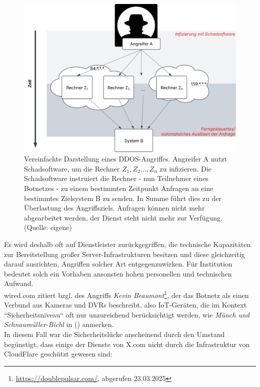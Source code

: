 \begin{figure}
    \centering
    \includegraphics[scale=0.3]{aufgabe 2/img/ddos.svg}
    \caption{Vereinfachte Darstellung eines DDOS-Angriffes. Angreifer A nutzt Schadsoftware, um die Rechner $Z_1, Z_2 \ldots, Z_n$ zu infizieren. Die Schadsoftware  instruiert die Rechner - nun Teilnehmer eines Botnetzes - zu einem bestimmten Zeitpunkt Anfragen an eine bestimmtes Zielsystem B zu senden. In Summe führt dies zu der Überlastung des Angriffsziels. Anfragen können nicht mehr abgearbeitet werden, der Dienst steht nicht mehr zur Verfügung. (Quelle: eigene)}
    \label{fig:ddos}
\end{figure}


\noindent
Es wird deshalb oft auf Dienstleister zurückgegriffen, die technische Kapazitäten zur Bereitstellung großer Server-Infrastrukturen besitzen und diese gleichzeitig darauf ausrichten, Angriffen solcher Art entgegenzuwirken.
Für Institution bedeutet solch ein Vorhaben ansonsten hohen personellen und technischen Aufwand.\\

\noindent
wired.com zitiert bzgl. des Angriffs \textit{Kevin Beaumont}\footnote{
    \url{https://doublepulsar.com/}, abgerufen 23.03.2025
}, der das Botnetz als einen Verbund aus Kameras und DVRs beschreibt, also IoT-Geräten, die im Kontext ``Sicherheitsniveau`` oft nur unzureichend berücksichtigt werden, wie \textit{Münch und Schnaumüller-Bichl} in  (\cite[36]{ITS2}) anmerken.\\
In diesem Fall war die Sicherheitslücke anscheinend durch den Umstand begünstigt, dass einige der Dienste von X.com nicht durch die Infrastruktur von CloudFlare geschützt gewesen sind:


